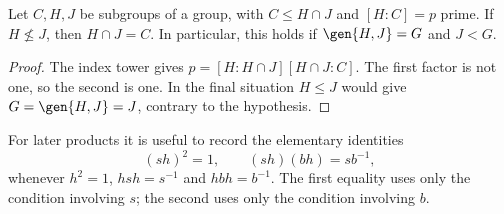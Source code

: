 \begin{lemma}\label{UF.PrimeIndex}
Let $C,H,J$ be subgroups of a group, with $C\leq H\cap J$ and
$[H:C]=p$ prime. If $H\not\leq J$, then $H\cap J=C$.
In particular, this holds if $\gen{H,J}=G$ and $J<G$.
\end{lemma}
\begin{proof}
The index tower gives
$p=[H:H\cap J][H\cap J:C]$. The first factor is not one,
so the second is one. In the final situation $H\leq J$ would give
$G=\gen{H,J}=J$, contrary to the hypothesis.
\end{proof}
For later products it is useful to record the elementary identities
\begin{equation}\label{eq:reflections}
 (sh)^2=1,\qquad (sh)(bh)=sb^{-1},
\end{equation}
whenever $h^2=1$, $hsh=s^{-1}$ and $hbh=b^{-1}$.
The first equality uses only the condition involving $s$; the second
uses only the condition involving $b$.
